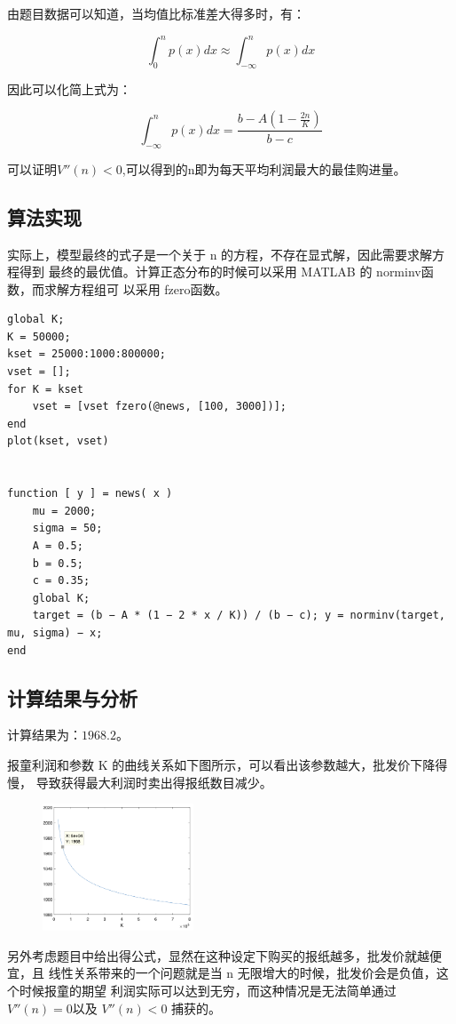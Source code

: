 \documentclass{article}
\begin{document}
由题目数据可以知道，当均值比标准差大得多时，有：

$$\int^n_0p(x)dx\approx\int^n_{-\infty}p(x)dx$$

因此可以化简上式为：

$$\int^n_{-\infty}p(x)dx=\frac{b-A(1-\frac{2n}{K})}{b-c}$$

可以证明$V''(n)<0$,可以得到的n即为每天平均利润最大的最佳购进量。


\subsection{算法实现}

实际上，模型最终的式子是一个关于 n 的方程，不存在显式解，因此需要求解方程得到 最终的最优值。计算正态分布的时候可以采用 MATLAB 的 norminv函数，而求解方程组可 以采用 fzero函数。


\begin{lstlisting}
global K;
K = 50000;
kset = 25000:1000:800000;
vset = [];
for K = kset
    vset = [vset fzero(@news, [100, 3000])];
end
plot(kset, vset)


function [ y ] = news( x )
    mu = 2000;
	sigma = 50;
	A = 0.5;
	b = 0.5;
	c = 0.35;
	global K;
	target = (b − A * (1 − 2 * x / K)) / (b − c); y = norminv(target, mu, sigma) − x;
end

\end{lstlisting}

\subsection{计算结果与分析}

计算结果为：$1968.2$。

报童利润和参数 K 的曲线关系如下图所示，可以看出该参数越大，批发价下降得慢， 导致获得最大利润时卖出得报纸数目减少。

\begin{figure}[H]
    \centering
    \includegraphics[width=0.4\textwidth]{pic2.png}
\end{figure}

另外考虑题目中给出得公式，显然在这种设定下购买的报纸越多，批发价就越便宜，且 线性关系带来的一个问题就是当 n 无限增大的时候，批发价会是负值，这个时候报童的期望 利润实际可以达到无穷，而这种情况是无法简单通过 $V''(n) = 0 $以及 $V''(n) < 0$ 捕获的。
\end{document}
